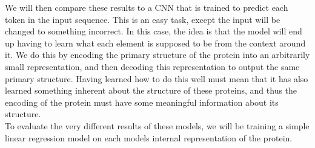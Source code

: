 \noindent
We will then compare these results to a CNN that is trained to predict each token in the input sequence. This is an easy task, except the input will be changed to something incorrect. In this case, the idea is that the model will end up having to learn what each element is supposed to be from the context around it. We do this by encoding the primary structure of the protein into an arbitrarily small representation, and then decoding this representation to output the same primary structure. Having learned how to do this well must mean that it has also learned something inherent about the structure of these proteins, and thus the encoding of the protein must have some meaningful information about its structure.\\

\noindent
To evaluate the very different results of these models, we will be training a simple linear regression model on each models internal representation of the protein.
